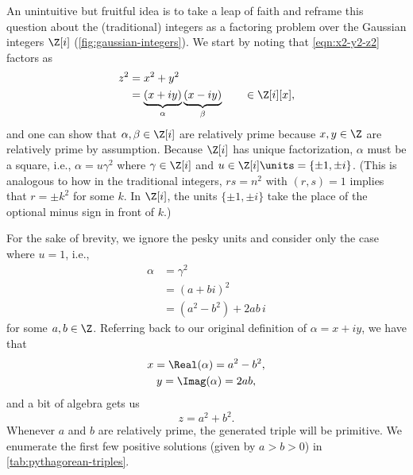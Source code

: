 An unintuitive but fruitful idea is to take a leap of faith and reframe this question about the (traditional) integers as a factoring problem over the Gaussian integers $\Z[i]$ (\autoref{fig:gaussian-integers}). We start by noting that \autoref{eqn:x2-y2-z2} factors as
\begin{equation}
    \begin{aligned}
        z^2 & = x^2 + y^2                                                                     \\
            & = \underbrace{(x + iy)}_\alpha \underbrace{(x - iy)}_\beta \qquad \in \Z[i][x],
    \end{aligned}
\end{equation}
and one can show that $\alpha, \beta \in \Z[i]$ are relatively prime because $x, y \in \Z$ are relatively prime by assumption. Because $\Z[i]$ has unique factorization, $\alpha$ must be a square, i.e., $\alpha = u \gamma^2$ where $\gamma \in \Z[i]$ and $u \in \Z[i] \units = \{ \pm 1, \pm i \}$. (This is analogous to how in the traditional integers, $rs = n^2$ with $(r, s) = 1$ implies that $r = \pm k^2$ for some $k$. In $\Z[i]$, the units $\{ \pm 1, \pm i \}$ take the place of the optional minus sign in front of $k$.)

For the sake of brevity, we ignore the pesky units and consider only the case where $u = 1$, i.e.,
\begin{equation}
    \begin{aligned}
        \alpha & = \gamma^2              \\
               & = (a + bi)^2            \\
               & = (a^2 - b^2)+ 2ab \, i
    \end{aligned}
\end{equation}
for some $a, b \in \Z$. Referring back to our original definition of $\alpha = x + iy$, we have that
\begin{equation}
    \begin{gathered}
        x = \Real(\alpha) = a^2 - b^2, \\
        y = \Imag(\alpha) = 2ab, \\
    \end{gathered}
\end{equation}
and a bit of algebra gets us
\begin{equation}
    z =  a^2 + b^2.
\end{equation}
Whenever $a$ and $b$ are relatively prime, the generated triple will be primitive. We enumerate the first few positive solutions (given by $a > b > 0$) in \autoref{tab:pythagorean-triples}.

